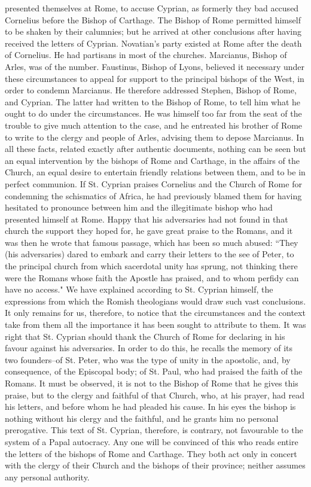 presented themselves at Rome, to accuse Cyprian, as formerly they bad accused Cornelius before the Bishop of Carthage. The Bishop of Rome permitted himself to be shaken by their calumnies; but he arrived at other conclusions after having received the letters of Cyprian. Novatian's party existed at Rome after the death of Cornelius. He had partisans in most of the churches. Marcianus, Bishop of Arles, was of the number. Faustinus, Bishop of Lyons, believed it necessary under these circumstances to appeal for support to the principal bishops of the West, in order to condemn Marcianus. He therefore addressed Stephen, Bishop of Rome, and Cyprian. The latter had written to the Bishop of Rome, to tell him what he ought to do under the circumstances. He was himself too far from the seat of the trouble to give much attention to the case, and he entreated his brother of Rome to write to the clergy and people of Arles, advising them to depose Marcianus. In all these facts, related exactly after authentic documents, nothing can be seen but an equal intervention by the bishops of Rome and Carthage, in the affairs of the Church, an equal desire to entertain friendly relations between them, and to be in perfect communion. If St. Cyprian praises Cornelius and the Church of Rome for condemning the schismatics of Africa, he had previously blamed them for having hesitated to pronounce between him and the illegitimate bishop who had presented himself at Rome. Happy that his adversaries had not found in that church the support they hoped for, he gave great praise to the Romans, and it was then he wrote that famous passage, which has been so much abused: “They (his adversaries) dared to embark and carry their letters to the see of Peter, to the principal church from which sacerdotal unity has sprung, not thinking there were the Romans whose faith the Apostle has praised, and to whom perfidy can have no access." We have explained according to St. Cyprian himself, the expressions from which the Romish theologians would draw such vast conclusions. It only remains for us, therefore, to notice that the circumstances and the context take from them all the importance it has been sought to attribute to them. It was right that St. Cyprian should thank the Church of Rome for declaring in his favour against his adversaries. In order to do this, he recalls the memory of its two founders--of St. Peter, who was the type of unity in the apostolic, and, by consequence, of the Episcopal body; of St. Paul, who had praised the faith of the Romans. It must be observed, it is not to the Bishop of Rome that he gives this praise, but to the clergy and faithful of that Church, who, at his prayer, had read his letters, and before whom he had pleaded his cause. In his eyes the bishop is nothing without his clergy and the faithful, and he grants him no personal prerogative. This text of St. Cyprian, therefore, is contrary, not favourable to the system of a Papal autocracy. Any one will be convinced of this who reads entire the letters of the bishops of Rome and Carthage. They both act only in concert with the clergy of their Church and the bishops of their province; neither assumes any personal authority.

